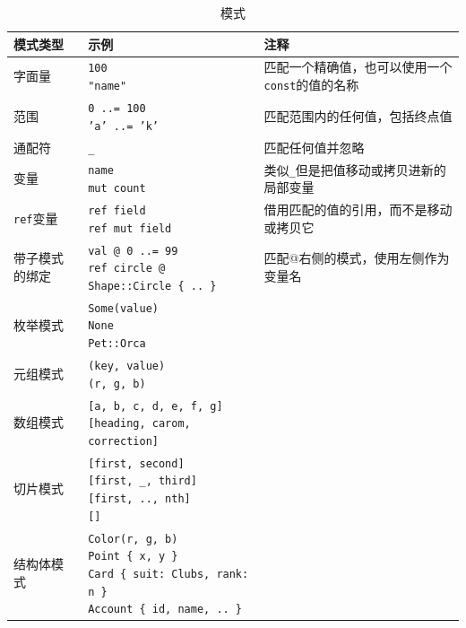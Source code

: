 \begin{table}[htbp]
    \centering
    \caption{模式}
    \label{t10-1}
    \begin{tabular}{p{}p{}p{}}
        \hline
        \textbf{模式类型} & \textbf{示例} & \textbf{注释} \\
        \hline
        字面量  & \makecell[l]{\texttt{100} \\ \texttt{"name"}} & 匹配一个精确值，也可以使用一个\texttt{const}的值的名称    \\
        \rowcolor{tablecolor}
        范围    & \makecell[l]{\texttt{0 ..= 100} \\ \texttt{'a' ..= 'k'}}  & 匹配范围内的任何值，包括终点值 \\
        通配符  & \texttt{\_}   & 匹配任何值并忽略  \\
        \rowcolor{tablecolor}
        变量    & \makecell[l]{\texttt{name} \\ \texttt{mut count}} & 类似\texttt{\_}但是把值移动或拷贝进新的局部变量   \\
        \texttt{ref}变量    & \makecell[l]{\texttt{ref field} \\ \texttt{ref mut field}}    & 借用匹配的值的引用，而不是移动或拷贝它    \\
        \rowcolor{tablecolor}
        带子模式的绑定  & \makecell[l]{\texttt{val @ 0 ..= 99} \\ \texttt{ref circle @ Shape::Circle \{ .. \}}} & 匹配@右侧的模式，使用左侧作为变量名   \\
        枚举模式    & \makecell[l]{\texttt{Some(value)} \\ \texttt{None} \\ \texttt{Pet::Orca}} & \\
        \rowcolor{tablecolor}
        元组模式    & \makecell[l]{\texttt{(key, value)} \\ \texttt{(r, g, b)}} & \\
        数组模式    & \makecell[l]{\texttt{[a, b, c, d, e, f, g]} \\ \texttt{[heading, carom, correction]}} & \\
        \rowcolor{tablecolor}
        切片模式    & \makecell[l]{\texttt{[first, second]} \\ \texttt{[first, \_, third]} \\ \texttt{[first, .., nth]} \\ \texttt{[]}}  & \\
        结构体模式  & \makecell[l]{\texttt{Color(r, g, b)} \\ \texttt{Point \{ x, y \}} \\ \texttt{Card \{ suit: Clubs, rank: n \}} \\ \texttt{Account \{ id, name, .. \}}} & \\

\end{tabular}
\end{table}

